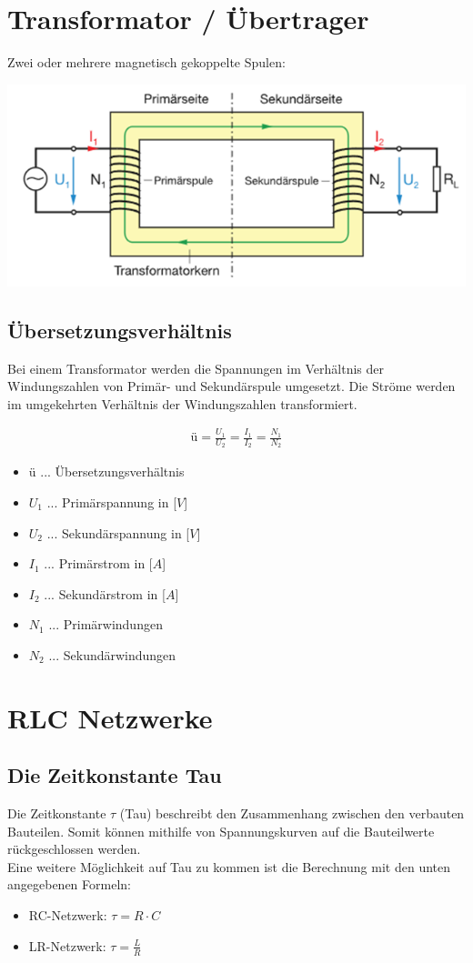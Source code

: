 \newpage

\section{Transformator / Übertrager}
Zwei oder mehrere magnetisch gekoppelte Spulen:

\includegraphics[width=0.7 \linewidth]{LineareBauteile/Traffo.png}

\subsection{Übersetzungsverhältnis}

Bei einem Transformator werden die Spannungen im Verhältnis der Windungszahlen von Primär- und Sekundärspule umgesetzt. Die Ströme werden im umgekehrten Verhältnis der Windungszahlen transformiert.

\begin{align}
    \text{ü} = \frac{U_1}{U_2} = \frac{I_1}{I_2} = \frac{N_1}{N_2}
\end{align}
\begin{itemize}
    \item ü ... Übersetzungsverhältnis
    \item $U_1$ ... Primärspannung in [$V$]
    \item $U_2$ ... Sekundärspannung in [$V$]
    \item $I_1$ ... Primärstrom in [$A$]
    \item $I_2$ ... Sekundärstrom in [$A$]
    \item $N_1$ ... Primärwindungen
    \item $N_2$ ... Sekundärwindungen
\end{itemize}

\newpage

\section{RLC Netzwerke}
\subsection{Die Zeitkonstante Tau}
Die Zeitkonstante $\tau$ (Tau) beschreibt den Zusammenhang zwischen den verbauten Bauteilen. Somit können mithilfe von Spannungskurven auf die Bauteilwerte rückgeschlossen werden. \\
Eine weitere Möglichkeit auf Tau zu kommen ist die Berechnung mit den unten angegebenen Formeln:
\begin{itemize}
    \item RC-Netzwerk: {\large $\tau = R\cdot C$}
    \item LR-Netzwerk: {\large $\tau = \frac{L}{R}$}
\end{itemize}
